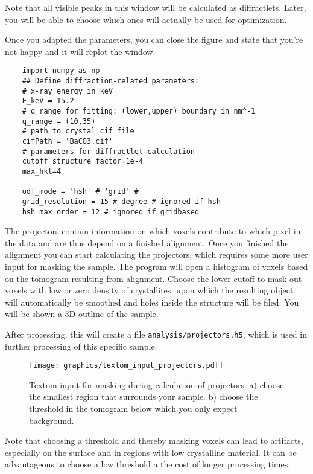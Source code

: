 Note that all visible peaks in this window will be calculated as diffractlets. Later, you will be able to choose
which ones will actually be used for optimization.

Once you adapted the parameters, you can close the figure and state that you're not happy and it will replot the window.

\begin{verbatim}
    import numpy as np
    ## Define diffraction-related parameters:
    # x-ray energy in keV
    E_keV = 15.2
    # q range for fitting: (lower,upper) boundary in nm^-1
    q_range = (10,35)
    # path to crystal cif file
    cifPath = 'BaCO3.cif'
    # parameters for diffractlet calculation
    cutoff_structure_factor=1e-4
    max_hkl=4

    odf_mode = 'hsh' # 'grid' # 
    grid_resolution = 15 # degree # ignored if hsh
    hsh_max_order = 12 # ignored if gridbased
\end{verbatim}

The projectors contain information on which voxels contribute to which pixel in the data and
are thus depend on a finished alignment. Once you finished the alignment you can start calculating the projectors,
which requires some more user input for masking the sample. The program will open a histogram of voxels based on the
tomogram resulting from alignment. Choose the lower cutoff to mask out voxels with low or zero density of crystallites,
upon which the resulting object will automatically be smoothed and holes inside the structure will be filed.
You will be shown a 3D outline of the sample.

After processing, this will create a file \texttt{analysis/projectors.h5}, which is used in further processing of this specific sample.

\begin{figure}[h!]
    \texttt{[image: graphics/textom\_input\_projectors.pdf]}
    \centering
    \caption{Textom input for masking during calculation of projectors. 
        a) choose the smallest region that surrounds your sample.
        b) choose the threshold in the tomogram below which you only expect background.
        }
\end{figure}

Note that choosing a threshold and thereby masking voxels can lead to artifacts, especially on the surface and in regions
with low crystalline material. It can be advantageous to choose a low threshold a the cost of longer processing times.

